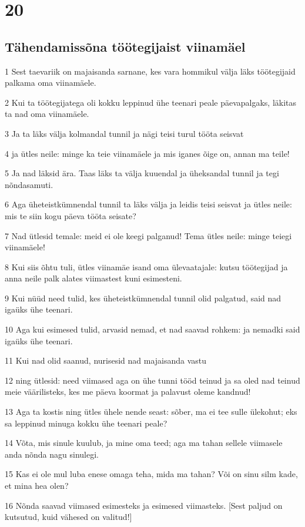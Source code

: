 \chapter{20}

\section*{Tähendamissõna töötegijaist viinamäel}

\par 1 Sest taevariik on majaisanda sarnane, kes vara hommikul välja läks töötegijaid palkama oma viinamäele.
\par 2 Kui ta töötegijatega oli kokku leppinud ühe teenari peale päevapalgaks, läkitas ta nad oma viinamäele.
\par 3 Ja ta läks välja kolmandal tunnil ja nägi teisi turul tööta seisvat
\par 4 ja ütles neile: minge ka teie viinamäele ja mis iganes õige on, annan ma teile!
\par 5 Ja nad läksid ära. Taas läks ta välja kuuendal ja üheksandal tunnil ja tegi nõndasamuti.
\par 6 Aga üheteistkümnendal tunnil ta läks välja ja leidis teisi seisvat ja ütles neile: mis te siin kogu päeva tööta seisate?
\par 7 Nad ütlesid temale: meid ei ole keegi palganud! Tema ütles neile: minge teiegi viinamäele!
\par 8 Kui siis õhtu tuli, ütles viinamäe isand oma ülevaatajale: kutsu töötegijad ja anna neile palk alates viimastest kuni esimesteni.
\par 9 Kui nüüd need tulid, kes üheteistkümnendal tunnil olid palgatud, said nad igaüks ühe teenari.
\par 10 Aga kui esimesed tulid, arvasid nemad, et nad saavad rohkem: ja nemadki said igaüks ühe teenari.
\par 11 Kui nad olid saanud, nurisesid nad majaisanda vastu
\par 12 ning ütlesid: need viimased aga on ühe tunni tööd teinud ja sa oled nad teinud meie väärilisteks, kes me päeva koormat ja palavust oleme kandnud!
\par 13 Aga ta kostis ning ütles ühele nende seast: sõber, ma ei tee sulle ülekohut; eks sa leppinud minuga kokku ühe teenari peale?
\par 14 Võta, mis sinule kuulub, ja mine oma teed; aga ma tahan sellele viimasele anda nõnda nagu sinulegi.
\par 15 Kas ei ole mul luba enese omaga teha, mida ma tahan? Või on sinu silm kade, et mina hea olen?
\par 16 Nõnda saavad viimased esimesteks ja esimesed viimasteks. [Sest paljud on kutsutud, kuid vähesed on valitud!]

